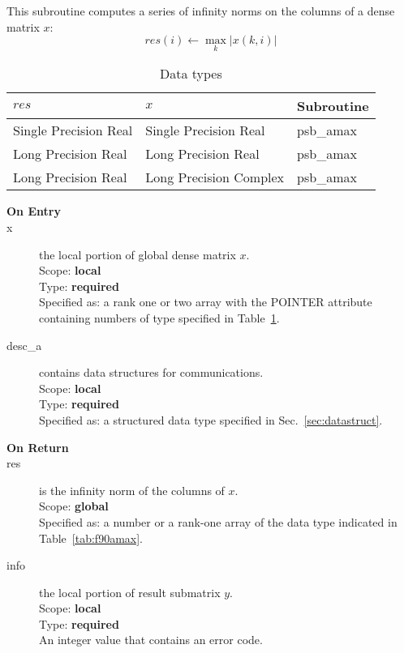 
This subroutine computes a series of  infinity norms on the columns of
a  dense matrix  $x$: 
\[ res(i) \leftarrow \max_k |x(k,i)| \]

\begin{table}[h]
\begin{center}
\begin{tabular}{lll}
\hline
$res$&  $x$& {\bf Subroutine}\\
\hline
Single Precision Real  &Single Precision Real  & psb\_amax\\
Long Precision Real    &Long Precision Real    & psb\_amax\\
Long Precision Real &Long Precision Complex & psb\_amax\\	
\hline
\end{tabular}
\end{center}
\caption{Data types\label{tab:f90mamax}}
\end{table}

\begin{description}
\item[\bf On Entry]
\item[x] the local portion of global dense matrix
$x$. \\
Scope: {\bf local} \\
Type: {\bf required} \\
Specified as: a rank one or two array with the POINTER attribute
containing numbers of type specified in
Table~\ref{tab:f90mamax}. 
\item[desc\_a] contains data structures for communications.\\
Scope: {\bf local} \\
Type: {\bf required}\\
Specified as: a structured data type specified in Sec.~\ref{sec:datastruct}.
\item[\bf On Return] 
\item[res] is the infinity norm of the columns of $x$.\\
Scope: {\bf global} \\
Specified as: a number or a rank-one array  of the data type indicated
in Table~\ref{tab:f90amax}. 
\item[info] the local portion of result submatrix $y$.\\
Scope: {\bf local} \\
Type: {\bf required} \\
An integer value that contains an error code. 
\end{description}

